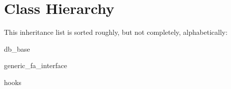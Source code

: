 \section{Class Hierarchy}
This inheritance list is sorted roughly, but not completely, alphabetically\+:\begin{DoxyCompactList}
\item db\+\_\+base\begin{DoxyCompactList}
\item {}
\end{DoxyCompactList}
\item generic\+\_\+fa\+\_\+interface\begin{DoxyCompactList}
\item {}
\item {}
\end{DoxyCompactList}
\item hooks\begin{DoxyCompactList}
\item {}
\end{DoxyCompactList}
\end{DoxyCompactList}
